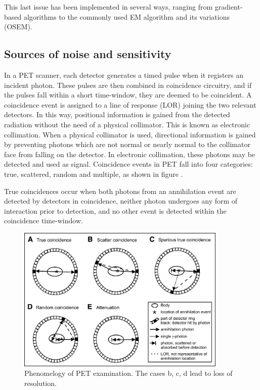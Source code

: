 This last issue has been implemented in several ways, ranging from gradient-based algorithms to the commonly used EM algorithm and its variations (OSEM).

\subsection{Sources of noise and sensitivity}
In a PET scanner, each detector generates a timed pulse when it registers an incident photon. These pulses are then combined in coincidence circuitry, and if the pulses fall within a short time-window, they are deemed to be coincident.
A coincidence event is assigned to a line of response (LOR) joining the two relevant detectors. In this way, positional information is gained from the detected radiation without the need of a physical collimator. This is known as electronic collimation.
When a physical collimator is used, directional information is gained by preventing photons which are not normal or nearly normal to the collimator face from falling on the detector. In electronic collimation, these photons may be detected and used as signal.
Coincidence events in PET fall into four categories: true, scattered, random and multiple, as shown in figure . 

True coincidences occur when both photons from an annihilation event are detected by detectors in coincidence, neither photon undergoes any form of interaction prior to detection, and no other event is detected within the coincidence time-window.

\begin{figure}  
\centering
\includegraphics[width=10cm]{Pictures/Chapter_1/coinci_PET}
\caption[Coincidencies in PET exam]{Phenomelogy of PET examination. The cases b, c, d lead to loss of resolution.}
\label{fig:coinc}
\end{figure}

